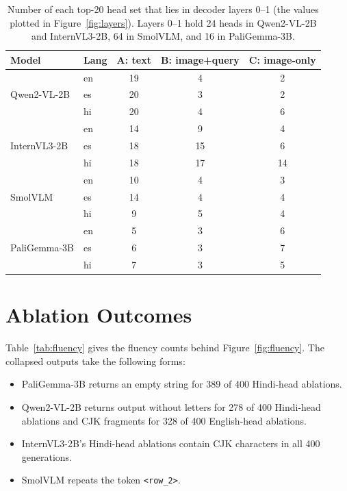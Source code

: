 \documentclass[10pt]{article}
\begin{document}
\begin{table}[H]
\centering
\caption{Number of each top-20 head set that lies in decoder layers 0--1 (the values plotted in Figure~\ref{fig:layers}). Layers 0--1 hold 24 heads in Qwen2-VL-2B and InternVL3-2B, 64 in SmolVLM, and 16 in PaliGemma-3B.}
\label{tab:layers}
\begin{tabular}{ll ccc}
\toprule
Model & Lang & A: text & B: image+query & C: image-only \\
\midrule
\multirow{3}{*}{Qwen2-VL-2B}  & en & 19 & 4 & 2 \\ & es & 20 & 3 & 2 \\ & hi & 20 & 4 & 6 \\
\midrule
\multirow{3}{*}{InternVL3-2B} & en & 14 & 9 & 4 \\ & es & 18 & 15 & 6 \\ & hi & 18 & 17 & 14 \\
\midrule
\multirow{3}{*}{SmolVLM}      & en & 10 & 4 & 3 \\ & es & 14 & 4 & 4 \\ & hi & 9 & 5 & 4 \\
\midrule
\multirow{3}{*}{PaliGemma-3B} & en & 5 & 3 & 6 \\ & es & 6 & 3 & 7 \\ & hi & 7 & 3 & 5 \\
\bottomrule
\end{tabular}
\end{table}

\section{Ablation Outcomes}
\label{app:ablation}

Table~\ref{tab:fluency} gives the fluency counts behind Figure~\ref{fig:fluency}. The collapsed outputs take the following forms:
\begin{itemize}
    \item PaliGemma-3B returns an empty string for 389 of 400 Hindi-head ablations.
    \item Qwen2-VL-2B returns output without letters for 278 of 400 Hindi-head ablations and CJK fragments for 328 of 400 English-head ablations.
    \item InternVL3-2B's Hindi-head ablations contain CJK characters in all 400 generations.
    \item SmolVLM repeats the token \texttt{<row\_2>}.
\end{itemize}
\end{document}
